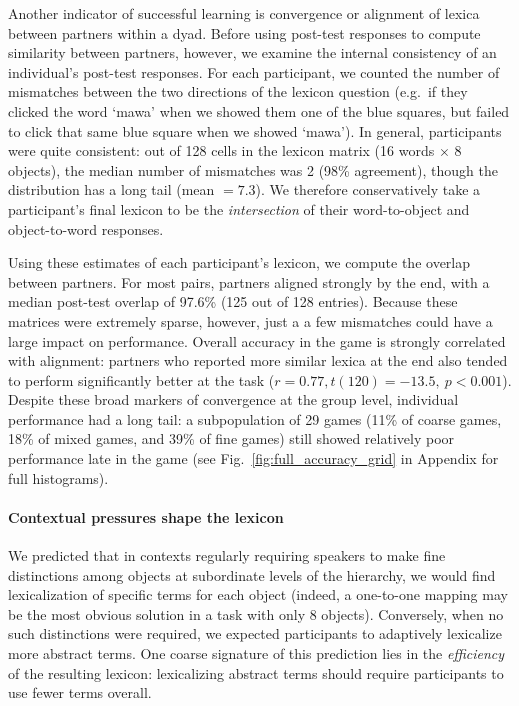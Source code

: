 Another indicator of successful learning is convergence or alignment of lexica between partners within a dyad. 
Before using post-test responses to compute similarity between partners, however, we examine the internal consistency of an individual's post-test responses. 
For each participant, we counted the number of mismatches between the two directions of the lexicon question (e.g.\ if they clicked the word `mawa' when we showed them one of the blue squares, but failed to click that same blue square when we showed `mawa'). 
In general, participants were quite consistent: out of 128 cells in the lexicon matrix (16 words $\times$ 8 objects), the median number of mismatches was 2 (98\% agreement), though the distribution has a long tail (mean $= 7.3$). 
We therefore conservatively take a participant's final lexicon to be the \emph{intersection} of their word-to-object and object-to-word responses.

Using these estimates of each participant's lexicon, we compute the overlap between partners. 
For most pairs, partners aligned strongly by the end, with a median post-test overlap of 97.6\% (125 out of 128 entries). 
Because these matrices were extremely sparse, however, just a a few mismatches could have a large impact on performance. 
Overall accuracy in the game is strongly correlated with alignment: partners who reported more similar lexica at the end also tended to perform significantly better at the task ($r = 0.77, t(120) = -13.5,~p <0.001$).  
Despite these broad markers of convergence at the group level, individual performance had a long tail: a subpopulation of 29 games (11\% of coarse games, 18\% of mixed games, and 39\% of fine games) still showed relatively poor performance late in the game (see Fig.~\ref{fig:full_accuracy_grid} in Appendix for full histograms).

\paragraph{Contextual pressures shape the lexicon}

We predicted that in contexts regularly requiring speakers to make fine distinctions among objects at subordinate levels of the hierarchy, we would find lexicalization of specific terms for each object (indeed, a one-to-one mapping may be the most obvious solution in a task with only 8 objects). 
Conversely, when no such distinctions were required, we expected participants to adaptively lexicalize more abstract terms.
One coarse signature of this prediction lies in the \emph{efficiency} of the resulting lexicon: lexicalizing abstract terms should require participants to use fewer terms overall.

